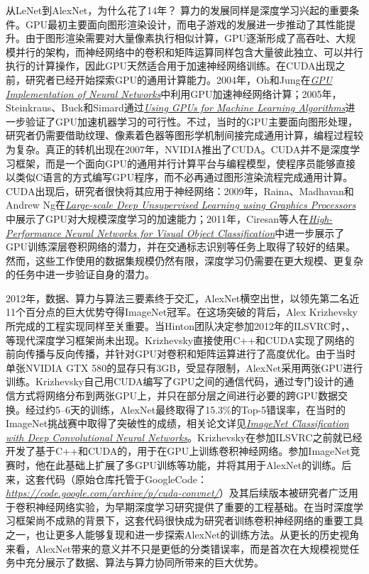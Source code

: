 \begin{cyanBox}{从LeNet到AlexNet，为什么花了14年？}
算力的发展同样是深度学习兴起的重要条件。GPU最初主要面向图形渲染设计，而电子游戏的发展进一步推动了其性能提升。由于图形渲染需要对大量像素执行相似计算，GPU逐渐形成了高吞吐、大规模并行的架构，而神经网络中的卷积和矩阵运算同样包含大量彼此独立、可以并行执行的计算操作，因此GPU天然适合用于加速神经网络训练。在CUDA出现之前，研究者已经开始探索GPU的通用计算能力。2004年，Oh和Jung在\href{https://doi.org/10.1016/j.patcog.2004.01.013}{\textit{GPU Implementation of Neural Networks}}中利用GPU加速神经网络计算；2005年，Steinkraus、Buck和Simard通过\href{https://doi.org/10.1109/ICDAR.2005.251}{\textit{Using GPUs for Machine Learning Algorithms}}进一步验证了GPU加速机器学习的可行性。不过，当时的GPU主要面向图形处理，研究者仍需要借助纹理、像素着色器等图形学机制间接完成通用计算，编程过程较为复杂。真正的转机出现在2007年，NVIDIA推出了CUDA。CUDA并不是深度学习框架，而是一个面向GPU的通用并行计算平台与编程模型，使程序员能够直接以类似C语言的方式编写GPU程序，而不必再通过图形渲染流程完成通用计算。CUDA出现后，研究者很快将其应用于神经网络：2009年，Raina、Madhavan和Andrew Ng在\href{https://proceedings.neurips.cc/paper_files/paper/2009/file/1c82eeb6e5d2b6f4f9b0a2b3b0c6a8c6-Paper.pdf}{\textit{Large-scale Deep Unsupervised Learning using Graphics Processors}}中展示了GPU对大规模深度学习的加速能力；2011年，Ciresan等人在\href{https://www.ijcai.org/Proceedings/11/Papers/001.pdf}{\textit{High-Performance Neural Networks for Visual Object Classification}}中进一步展示了GPU训练深层卷积网络的潜力，并在交通标志识别等任务上取得了较好的结果。然而，这些工作使用的数据集规模仍然有限，深度学习仍需要在更大规模、更复杂的任务中进一步验证自身的潜力。

2012年，数据、算力与算法三要素终于交汇，AlexNet横空出世，以领先第二名近11个百分点的巨大优势夺得ImageNet冠军。在这场突破的背后，Alex Krizhevsky所完成的工程实现同样至关重要。当Hinton团队决定参加2012年的ILSVRC时，、等现代深度学习框架尚未出现。Krizhevsky直接使用C++和CUDA实现了网络的前向传播与反向传播，并针对GPU对卷积和矩阵运算进行了高度优化。由于当时单张NVIDIA GTX 580的显存只有3GB，受显存限制，AlexNet采用两张GPU进行训练。Krizhevsky自己用CUDA编写了GPU之间的通信代码，通过专门设计的通信方式将网络分布到两张GPU上，并只在部分层之间进行必要的跨GPU数据交换。经过约5--6天的训练，AlexNet最终取得了15.3\%的Top-5错误率，在当时的ImageNet挑战赛中取得了突破性的成绩，相关论文详见\href{https://papers.nips.cc/paper/4824-imagenet-classification-with-deep-convolutional-neural-networks.pdf}{\textit{ImageNet Classification with Deep Convolutional Neural Networks}}。Krizhevsky在参加ILSVRC之前就已经开发了基于C++和CUDA的，用于在GPU上训练卷积神经网络。参加ImageNet竞赛时，他在此基础上扩展了多GPU训练等功能，并将其用于AlexNet的训练。后来，这套代码（原始仓库托管于GoogleCode：\href{https://code.google.com/archive/p/cuda-convnet/}{\textit{https://code.google.com/archive/p/cuda-convnet/}}）及其后续版本被研究者广泛用于卷积神经网络实验，为早期深度学习研究提供了重要的工程基础。在当时深度学习框架尚不成熟的背景下，这套代码很快成为研究者训练卷积神经网络的重要工具之一，也让更多人能够复现和进一步探索AlexNet的训练方法。从更长的历史视角来看，AlexNet带来的意义并不只是更低的分类错误率，而是首次在大规模视觉任务中充分展示了数据、算法与算力协同所带来的巨大优势。
\end{cyanBox}

